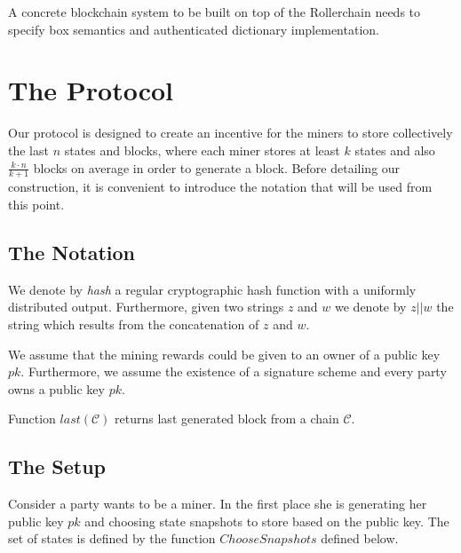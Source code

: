 \documentclass[conference,compsoc]{IEEEtran}
\begin{document}
A concrete blockchain system to be built on top of the Rollerchain needs to specify box semantics and authenticated dictionary implementation. 

\section{The Protocol}
\label{protocol}

Our protocol is designed to create an incentive for the miners to store collectively the last \(n\) states and blocks, where each miner stores at least \(k\) states and also \(\frac{k\cdot n}{k+1}\) blocks on average in order to generate a block. Before detailing our construction, it is convenient to introduce the notation that will be used from this point.

\subsection{The Notation}

We denote by \textit{hash}  a regular cryptographic hash function with a uniformly distributed output. Furthermore, given two strings \( z\) and \( w\) we denote by \( z || w \) the string which results from the concatenation of \( z\) and \( w\).

We assume that the mining rewards could be given to an owner of a public key \(pk\). Furthermore, we assume the existence of a signature scheme and every party owns a public key \(pk\). 

Function $last(\mathcal{C})$ returns last generated block from a chain $\mathcal{C}$.


\subsection{The Setup}

Consider a party wants to be a miner. In the first place she is generating her public key \(pk\) and choosing state snapshots to store based on the public key. The set of states is defined by the function \(ChooseSnapshots\) defined below. 
\end{document}
